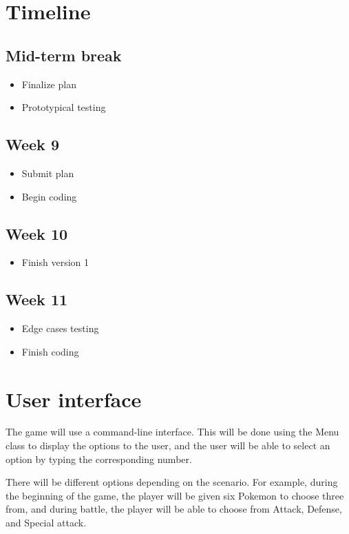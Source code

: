 \documentclass{article}
\begin{document}
  \pagebreak
  
  \section{Timeline}
  
  \subsection*{Mid-term break}
  \begin{itemize}
    \item Finalize plan
    \item Prototypical testing
  \end{itemize}
  
  \subsection*{Week 9}
  \begin{itemize}
    \item Submit plan
    \item Begin coding
  \end{itemize}
  
  \subsection*{Week 10}
  \begin{itemize}
    \item Finish version 1
  \end{itemize}
  
  \subsection*{Week 11}
  \begin{itemize}
    \item Edge cases testing
    \item Finish coding
  \end{itemize}
    
  \setlength{\parindent}{0em}
  \setlength{\parskip}{1em}

  \section{User interface}
  
  The game will use a command-line interface. This will be done using the Menu class to display the options to the user, and the user will be able to select an option by typing the corresponding number. \par 
  There will be different options depending on the scenario. For example, during the beginning of the game, the player will be given six Pokemon to choose three from, and during battle, the player will be able to choose from Attack, Defense, and Special attack. 
  
\end{document}
